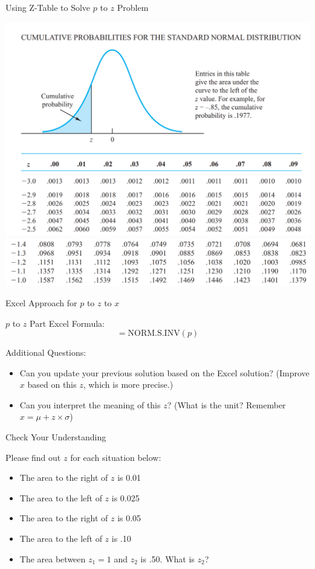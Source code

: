 \documentclass{beamer}
\begin{document}
\begin{frame}{Using Z-Table to Solve $p$ to $z$ Problem}

\begin{center}
\includegraphics[width = 260 pt]{images/section4zTableLookup.png}
\includegraphics[width = 250 pt]{images/section4zTableLookup15.png}
\end{center}

\end{frame}






\begin{frame}{Excel Approach for $p$ to $z$ to $x$}

$p$ to $z$ Part Excel Formula: 
$$ =\text{NORM.S.INV}(p)$$

\vspace{0.3 cm}

Additional Questions: 
\begin{itemize}
\item Can you update your previous solution based on the Excel solution? (Improve $x$ based on this $z$, which is more precise.)
\item Can you interpret the meaning of this $z$? (What is the unit? Remember $x = \mu + z \times \sigma$)
\end{itemize}

\end{frame}

\begin{frame}{Check Your Understanding}

Please find out $z$ for each situation below: 
\begin{itemize}
\item The area to the right of $z$ is 0.01
\item The area to the left of $z$ is 0.025
\item The area to the right of $z$ is 0.05
\item The area to the left of $z$ is .10
\item The area between $z_1 = 1$ and $z_2$ is .50. What is $z_2$?
\end{itemize}

\end{frame}
\end{document}
